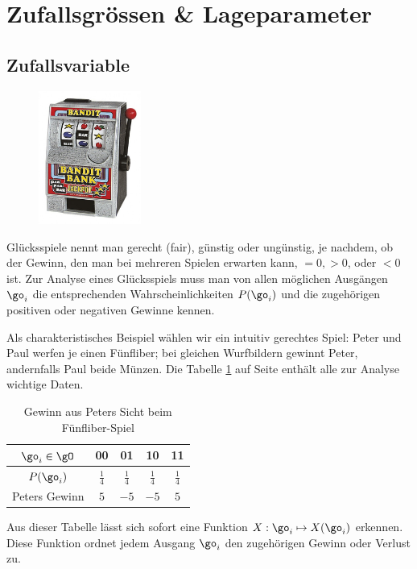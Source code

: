 \documentclass[%
11pt,%
twoside,%
titlepage,%
german,%
headsepline%
]{scrartcl}
\newcommand{\spaltenheight}{\rule{0mm}{3ex}}
\newcommand{\spaltensep}{\\[1ex]}
\begin{document}
\clearpage

\section{Zufallsgrössen \& Lageparameter}

\subsection{Zufallsvariable}
\begin{figure}
  \begin{center}
    \includegraphics[width=0.3\textwidth]{pictures/bandit}
  \end{center}
\end{figure}
Glücksspiele nennt man gerecht (fair), günstig oder ungünstig, je nachdem, ob der Gewinn, den man bei mehreren Spielen erwarten kann, $=0, >0$, oder $<0$ ist. Zur Analyse eines Glücksspiels muss man von allen möglichen Ausgängen $\go_i$ die entsprechenden Wahrscheinlichkeiten $P(\go_i)$ und die zugehörigen positiven oder negativen Gewinne kennen.

\begin{bsp}
Als charakteristisches Beispiel wählen wir ein intuitiv gerechtes Spiel: Peter und Paul werfen je einen Fünfliber; bei gleichen Wurfbildern gewinnt Peter, andernfalls Paul beide Münzen.
Die Tabelle \ref{tab:5liber} auf Seite \pageref{tab:5liber} enthält alle zur Analyse wichtige Daten.

\begin{table}
\begin{center}
\begin{tabular}{|c|c|c|c|c|}
\hline
\rowcolor{Gray}\spaltenheight $\go_i\in\gO$ & 00 & 01 & 10 & 11\spaltensep \hline
\rowcolor{lightyellow}\spaltenheight $P(\go_i)$ & $\frac{1}{4}$ & $\frac{1}{4}$ & $\frac{1}{4}$ & $\frac{1}{4}$\spaltensep \hline
\rowcolor{Gray}\spaltenheight Peters Gewinn & $5$ & $-5$ & $-5$ & $5$\spaltensep \hline
\end{tabular}
\end{center}
\caption{Gewinn aus Peters Sicht beim Fünfliber-Spiel}\label{tab:5liber}
\end{table}
\end{bsp}
Aus dieser Tabelle lässt sich sofort eine Funktion $X:\go_i\mapsto X(\go_i)$
erkennen. Diese Funktion ordnet jedem Ausgang $\go_i$ den zugehörigen Gewinn oder Verlust zu.
\end{document}
